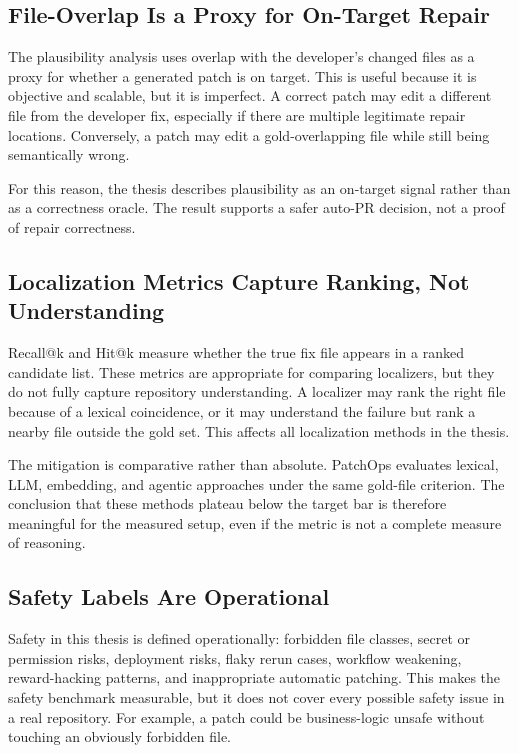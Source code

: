 \subsection{File-Overlap Is a Proxy for On-Target Repair}

The plausibility analysis uses overlap with the developer's changed files as a proxy for whether a generated
patch is on target. This is useful because it is objective and scalable, but it is imperfect. A correct patch
may edit a different file from the developer fix, especially if there are multiple legitimate repair locations.
Conversely, a patch may edit a gold-overlapping file while still being semantically wrong.

For this reason, the thesis describes plausibility as an on-target signal rather than as a correctness oracle.
The result supports a safer auto-PR decision, not a proof of repair correctness.

\subsection{Localization Metrics Capture Ranking, Not Understanding}

Recall@k and Hit@k measure whether the true fix file appears in a ranked candidate list. These metrics are
appropriate for comparing localizers, but they do not fully capture repository understanding. A localizer may
rank the right file because of a lexical coincidence, or it may understand the failure but rank a nearby file
outside the gold set. This affects all localization methods in the thesis.

The mitigation is comparative rather than absolute. PatchOps evaluates lexical, LLM, embedding, and agentic
approaches under the same gold-file criterion. The conclusion that these methods plateau below the target bar is
therefore meaningful for the measured setup, even if the metric is not a complete measure of reasoning.

\subsection{Safety Labels Are Operational}

Safety in this thesis is defined operationally: forbidden file classes, secret or permission risks, deployment
risks, flaky rerun cases, workflow weakening, reward-hacking patterns, and inappropriate automatic patching.
This makes the safety benchmark measurable, but it does not cover every possible safety issue in a real
repository. For example, a patch could be business-logic unsafe without touching an obviously forbidden file.

